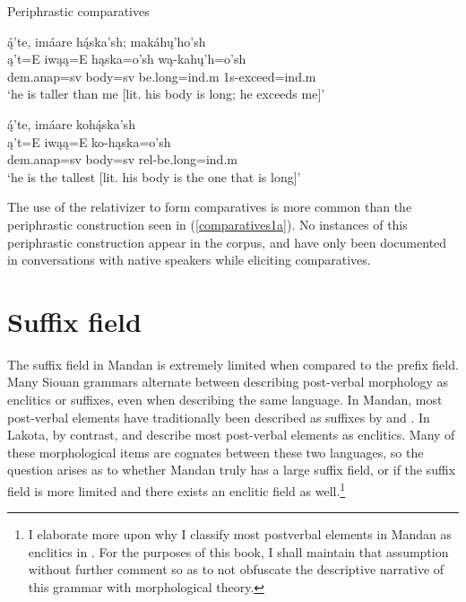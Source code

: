 \begin{exe}

\item\label{comparatives1} Periphrastic comparatives

\begin{xlist}

\item\label{comparatives1a} \glll ą́'te, imáare hą́ska'sh; makáhų'ho'sh\\
	ą't=E iwąą=E hąska=o'sh wą-kahų'h=o'sh\\
	dem.anap=sv \textnormal{body}=sv \textnormal{be.long}=ind.m 1s-\textnormal{exceed}=ind.m\\
	\glt `he is taller than me [lit. his body is long; he exceeds me]' \citep[22]{mixco1997a}
	
\item\label{comparatives1b} \glll ą́'te, imáare kohą́ska'sh\\
	ą't=E iwąą=E ko-hąska=o'sh\\
	dem.anap=sv \textnormal{body}=sv rel-\textnormal{be.long}=ind.m\\
	\glt `he is the tallest [lit. his body is the one that is long]' \citep[22]{mixco1997a}
	
\end{xlist}

\end{exe}

The use of the relativizer to form comparatives is more common than the periphrastic construction seen in (\ref{comparatives1a}). No instances of this periphrastic construction appear in the corpus, and have only been documented in conversations with native speakers while eliciting comparatives.

\section{Suffix field}\label{SecSuffixField}

The suffix field in Mandan is extremely limited when compared to the prefix field. Many Siouan grammars alternate between describing post-verbal morphology as enclitics or suffixes, even when describing the same language. In Mandan, most post-verbal elements have traditionally been described as suffixes by \citet{hollow1970} and \citet{mixco1997a}. In Lakota, by contrast, \citet{ingham2003} and \citet{mirzayan2010} describe most post-verbal elements as enclitics. Many of these morphological items are cognates between these two languages, so the question arises as to whether Mandan truly has a large suffix field, or if the suffix field is more limited and there exists an enclitic field as well.\footnote{I elaborate more upon why I classify most postverbal elements in Mandan as enclitics in \citet{kasak2019}. For the purposes of this book, I shall maintain that assumption without further comment so as to not obfuscate the descriptive narrative of this grammar with morphological theory.}

